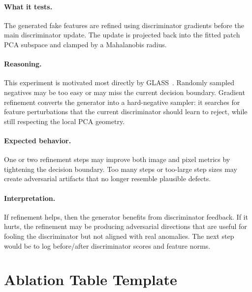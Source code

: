 \documentclass[11pt]{article}
\begin{document}
\paragraph{What it tests.}
The generated fake features are refined using discriminator gradients before
the main discriminator update. The update is projected back into the fitted
patch PCA subspace and clamped by a Mahalanobis radius.

\paragraph{Reasoning.}
This experiment is motivated most directly by GLASS~\cite{glass}. Randomly
sampled negatives may be too easy or may miss the current decision
boundary. Gradient refinement converts the generator into a hard-negative
sampler: it searches for feature perturbations that the current discriminator
should learn to reject, while still respecting the local PCA geometry.

\paragraph{Expected behavior.}
One or two refinement steps may improve both image and pixel metrics by tightening
the decision boundary. Too many steps or too-large step sizes may create
adversarial artifacts that no longer resemble plausible defects.

\paragraph{Interpretation.}
If refinement helps, then the generator benefits from discriminator feedback.
If it hurts, the refinement may be producing adversarial directions that are
useful for fooling the discriminator but not aligned with real anomalies. The
next step would be to log before/after discriminator scores and feature norms.

\section{Ablation Table Template}
\end{document}
